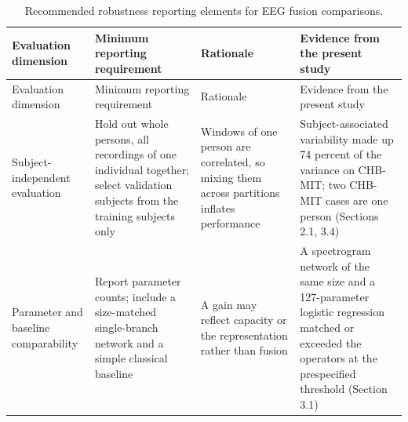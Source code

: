 \documentclass[11pt,a4paper]{article}
\begin{document}
\begin{longtable}[]{@{}
  >{\raggedright\arraybackslash}p{}
  >{\raggedright\arraybackslash}p{}
  >{\raggedright\arraybackslash}p{}
  >{\raggedright\arraybackslash}p{}@{}}
\caption{Recommended robustness reporting elements for EEG fusion comparisons.}\tabularnewline
\toprule\noalign{}
\begin{minipage}[b]{\linewidth}\raggedright
Evaluation dimension
\end{minipage} & \begin{minipage}[b]{\linewidth}\raggedright
Minimum reporting requirement
\end{minipage} & \begin{minipage}[b]{\linewidth}\raggedright
Rationale
\end{minipage} & \begin{minipage}[b]{\linewidth}\raggedright
Evidence from the present study
\end{minipage} \\
\midrule\noalign{}
\endfirsthead
\toprule\noalign{}
\begin{minipage}[b]{\linewidth}\raggedright
Evaluation dimension
\end{minipage} & \begin{minipage}[b]{\linewidth}\raggedright
Minimum reporting requirement
\end{minipage} & \begin{minipage}[b]{\linewidth}\raggedright
Rationale
\end{minipage} & \begin{minipage}[b]{\linewidth}\raggedright
Evidence from the present study
\end{minipage} \\
\midrule\noalign{}
\endhead
\bottomrule\noalign{}
\endlastfoot
Subject-independent evaluation & Hold out whole persons, all recordings of one individual together; select validation subjects from the training subjects only & Windows of one person are correlated, so mixing them across partitions inflates performance & Subject-associated variability made up 74 percent of the variance on CHB-MIT; two CHB-MIT cases are one person (Sections 2.1, 3.4) \\
Parameter and baseline comparability & Report parameter counts; include a size-matched single-branch network and a simple classical baseline & A gain may reflect capacity or the representation rather than fusion & A spectrogram network of the same size and a 127-parameter logistic regression matched or exceeded the operators at the prespecified threshold (Section 3.1) \\

\end{longtable}
\end{document}
